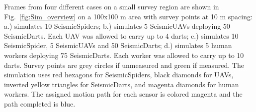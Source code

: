    Frames from four different cases on a small survey region are shown in Fig.~\ref{fig:Sim_overview} on a 100x100 m area with survey points at 10 m spacing:
   a.) simulates 10 SeismicSpiders;  
   b.) simulates 5 SeismicUAVs deploying 50 SeismicDarts. Each UAV was allowed to carry up to 4 darts;
   c.) simulates 10 SeismicSpider, 5 SeismicUAVs and 50 SeismicDarts;
   d.) simulates 5 human workers deploying 75 SeismicDarts. Each worker was allowed to carry up to 10 darts. 
 Survey points are grey circles if unmeasured and green if measured.   The simulation uses red hexagons for SeismicSpiders,  black diamonds for UAVs,  inverted yellow triangles for SeismicDarts, and magenta diamonds for human workers. The assigned motion path for each sensor is colored magenta and the path completed is blue. 

